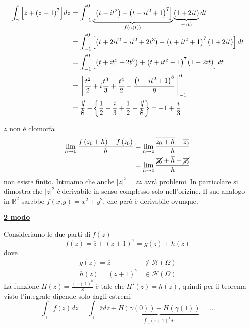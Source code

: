 \begin{align*}
\int\nolimits _{\gamma }\left[\overline{z} +\left( z+1\right)^{7}\right] dz & =\int\nolimits ^{0}_{-1}\underbrace{\left[\left( t-it^{2}\right) +\left( t+it^{2} +1\right)^{7}\right]}_{f\left( \gamma \left( t\right)\right)}\underbrace{\left( 1+2it\right)}_{\gamma '\left( t\right)} dt\\
 & =\int\nolimits ^{0}_{-1}\left[\left( t+2it^{2} -it^{2} +2t^{3}\right) +\left( t+it^{2} +1\right)^{7}\left( 1+2it\right)\right] dt\\
 & =\int\nolimits ^{0}_{-1}\left[\left( t+it^{2} +2t^{3}\right) +\left( t+it^{2} +1\right)^{7}\left( 1+2it\right)\right] dt\\
 & =\left[\frac{t^{2}}{2} +i\frac{t^{3}}{3} +\frac{t^{4}}{2} +\frac{\left( t+it^{2} +1\right)^{8}}{8}\right]^{0}_{-1}\\
 & =\cancel{\frac{1}{8}} -\left\{\frac{1}{2} -\frac{i}{3} +\frac{1}{2} +\cancel{\frac{1}{8}}\right\} =-1+\frac{i}{3}
\end{align*}
\begin{rem}
$\overline{z}$ non è olomorfa
\begin{align*}
\lim\limits _{h\rightarrow 0}\frac{f\left( z_{0} +h\right) -f\left( z_{0}\right)}{h} & =\lim\limits _{h\rightarrow 0}\frac{\overline{z_{0} +h} -\overline{z_{0}}}{h}\\
 & =\lim\limits _{h\rightarrow 0}\frac{\cancel{\overline{z_{0}}} +\overline{h} -\cancel{\overline{z_{0}}}}{h}
\end{align*}
non esiste finito. Intuiamo che anche $\left| z\right| ^{2} =z\overline{z}$ avrà problemi. In particolare si dimostra che $\left| z\right| ^{2}$ è derivabile in senso complesso solo nell'origine. Il suo analogo in $\mathbb{R}^{2}$ sarebbe $f\left( x,y\right) =x^{2} +y^{2}$, che però è derivabile ovunque.
\end{rem}
\textbf{\underline{2 modo}}

Consideriamo le due parti di $f\left( z\right)$
\begin{equation*}
f\left( z\right) =\overline{z} +\left( z+1\right)^{7} =g\left( z\right) +h\left( z\right)
\end{equation*}
dove
\begin{equation*}
\begin{aligned}
g\left( z\right) =\overline{z} & \notin \mathcal{H}\left( \Omega \right)\\
h\left( z\right) =\left( z+1\right)^{7} & \in \mathcal{H}\left( \Omega \right)
\end{aligned}
\end{equation*}
La funzione $H\left( z\right) =\frac{\left( z+1\right)^{8}}{8}$ è tale che $H'\left( z\right) =h\left( z\right)$, quindi per il teorema visto l'integrale dipende solo dagli estremi
\begin{equation*}
\int\nolimits _{\gamma } f\left( z\right) dz=\int\nolimits _{\gamma }\overline{z} dz+\underbrace{H\left( \gamma \left( 0\right)\right) -H\left( \gamma \left( 1\right)\right)}_{\int\nolimits _{\gamma }\left( z+1\right)^{7} dz} =\dotsc 
\end{equation*}
\Soluzione

